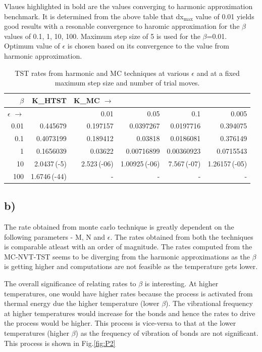 \documentclass{article}
\begin{document}
Vlaues highlighted in bold are the values converging to harmonic approximation benchmark. It is determined from the above table that dx$_{\text{max}}$ value of 0.01 yields good results with a resonable convergence to haromic approximation for the $\beta$ values of 0.1, 1, 10, 100. Maximum step size of 5 is used for the $\beta$=0.01.
Optimum value of $\epsilon$ is chosen based on its convergence to the value from harmonic approximation.

\begin{table}[htb]
\caption{TST rates from harmonic and MC techniques at various $\epsilon$ and at a fixed maximum step size and number of trial moves.}
\centering
\begin{tabular}{rrrrrr}
$\beta$ & K\_HTST & K\_MC $\rightarrow$ &  &  & \\
\hline
$\epsilon$ $\rightarrow$ &  & 0.01 & 0.05 & 0.1 & 0.005\\
0.01 & 0.445679 & 0.197157 & 0.0397267 & 0.0197716 & 0.394075\\
0.1 & 0.4073199 & 0.189412 & 0.03818 & 0.0186081 & 0.376149\\
1 & 0.1656039 & 0.03622 & 0.00716899 & 0.00360923 & 0.0715543\\
10 & 2.0437\,(-5) & 2.523\,(-06) & 1.00925\,(-06) & 7.567\,(-07) & 1.26157\,(-05)\\
100 & 1.6746\,(-44) & - & - & - & -\\
\end{tabular}
\end{table}

\subsection{b)}
\label{sec-2-2}
The rate obtained from monte carlo technique is greatly dependent on the following parameters - M, N and $\epsilon$. The rates obtained from both the techniques is comparable atleast with an order of magnitude. The rates computed from the MC-NVT-TST seems to be diverging from the harmonic approximations as the $\beta$ is getting higher and computations are not feasible as the temperature gets lower. 

The overall significance of relating rates to $\beta$ is interesting. At higher temperatures, one would have higher rates because the process is activated from thermal energy due the higher temperature (lower $\beta$).
The vibrational frequency at higher temperatures would increase for the bonds and hence the rates to drive the process would be higher. This process is vice-versa to that at the lower temperatures (higher $\beta$) as the frequency of vibration of bonds are not significant. This process is shown in Fig.\ref{fig:P2}
\end{document}
